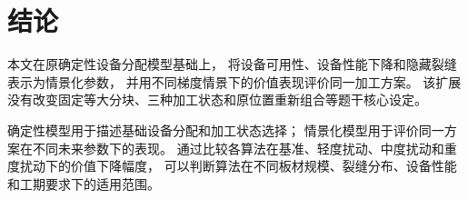 ﻿\documentclass[UTF8,12pt,a4paper]{ctexart}
\begin{document}
\section{结论}

\begin{description}[leftmargin=2em,labelsep=0.5em,itemsep=0.6em]
  \item[\textbf{模型扩展：}]
本文在原确定性设备分配模型基础上，
将设备可用性、设备性能下降和隐藏裂缝表示为情景化参数，
并用不同梯度情景下的价值表现评价同一加工方案。
该扩展没有改变固定等大分块、三种加工状态和原位置重新组合等题干核心设定。

  \item[\textbf{求解逻辑：}]
确定性模型用于描述基础设备分配和加工状态选择；
情景化模型用于评价同一方案在不同未来参数下的表现。
通过比较各算法在基准、轻度扰动、中度扰动和重度扰动下的价值下降幅度，
可以判断算法在不同板材规模、裂缝分布、设备性能和工期要求下的适用范围。
\end{description}
\end{document}
